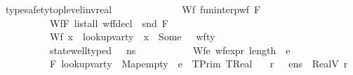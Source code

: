 \begin{isabellebody}
\isanewline
%
\endisadelimproof
\isanewline
{}\isamarkupfalse%
\ type{\isacharunderscore}{\kern0pt}safety{\isacharunderscore}{\kern0pt}top{\isacharunderscore}{\kern0pt}level{\isacharunderscore}{\kern0pt}inv{\isacharunderscore}{\kern0pt}real{\isacharcolon}{\kern0pt}\isanewline
\ \ \ \isanewline
\ \ \ \ \ \ \ \ \ \ Wf{\isacharunderscore}{\kern0pt}{\isasymGamma}{\isacharcolon}{\kern0pt}\ {\isachardoublequoteopen}fun{\isacharunderscore}{\kern0pt}interp{\isacharunderscore}{\kern0pt}wf\ F\ {\isasymGamma}{\isachardoublequoteclose}\ \isanewline
\ \ \ \ \ \ \ \ \ \ Wf{\isacharunderscore}{\kern0pt}F{\isacharcolon}{\kern0pt}\ {\isachardoublequoteopen}list{\isacharunderscore}{\kern0pt}all\ {\isacharparenleft}{\kern0pt}wf{\isacharunderscore}{\kern0pt}fdecl\ {\isasymcirc}\ snd{\isacharparenright}{\kern0pt}\ F{\isachardoublequoteclose}\ \isanewline
\ \ \ \ \ \ \ \ \ \ Wf{\isacharunderscore}{\kern0pt}{\isasymLambda}{\isacharcolon}{\kern0pt}\ {\isachardoublequoteopen}{\isasymforall}x\ {\isasymtau}{\isachardot}{\kern0pt}\ lookup{\isacharunderscore}{\kern0pt}var{\isacharunderscore}{\kern0pt}ty\ {\isasymLambda}\ x\ {\isacharequal}{\kern0pt}\ Some\ {\isasymtau}\ {\isasymlongrightarrow}\ wf{\isacharunderscore}{\kern0pt}ty\ {}\ {\isasymtau}{\isachardoublequoteclose}\ \ \ \ \ \isanewline
\ \ \ \ \ \ \ \ \ \ {\isachardoublequoteopen}state{\isacharunderscore}{\kern0pt}well{\isacharunderscore}{\kern0pt}typed\ {\isasymLambda}\ {\isacharbrackleft}{\kern0pt}{\isacharbrackright}{\kern0pt}\ n{\isacharunderscore}{\kern0pt}s{\isachardoublequoteclose}\ \isanewline
\ \ \ \ \ \ \ \ \ \ Wf{\isacharunderscore}{\kern0pt}e{\isacharcolon}{\kern0pt}\ {\isachardoublequoteopen}wf{\isacharunderscore}{\kern0pt}expr\ {\isacharparenleft}{\kern0pt}length\ {\isacharbrackleft}{\kern0pt}{\isacharbrackright}{\kern0pt}{\isacharparenright}{\kern0pt}\ e{\isachardoublequoteclose}\ \isanewline
\ \ \ \ \ \ \ \ \ \ {\isachardoublequoteopen}F{\isacharcomma}{\kern0pt}\ {\isacharparenleft}{\kern0pt}lookup{\isacharunderscore}{\kern0pt}var{\isacharunderscore}{\kern0pt}ty\ {\isasymLambda}{\isacharcomma}{\kern0pt}\ Map{\isachardot}{\kern0pt}empty{\isacharparenright}{\kern0pt}\ {\isasymturnstile}\ e\ {\isacharcolon}{\kern0pt}\ TPrim\ TReal{\isachardoublequoteclose}\isanewline
\ \ \ {\isachardoublequoteopen}{\isasymexists}r{\isachardot}{\kern0pt}\ {\isacharparenleft}{\kern0pt}{\isasymLambda}{\isacharcomma}{\kern0pt}{\isasymGamma}{\isacharcomma}{\kern0pt}{\isacharbrackleft}{\kern0pt}{\isacharbrackright}{\kern0pt}\ {\isasymturnstile}\ {\isasymlangle}e{\isacharcomma}{\kern0pt}n{\isacharunderscore}{\kern0pt}s{\isasymrangle}\ {\isasymDown}\ {\isacharparenleft}{\kern0pt}RealV\ r{\isacharparenright}{\kern0pt}{\isacharparenright}{\kern0pt}{\isachardoublequoteclose}\isanewline

\end{isabellebody}
